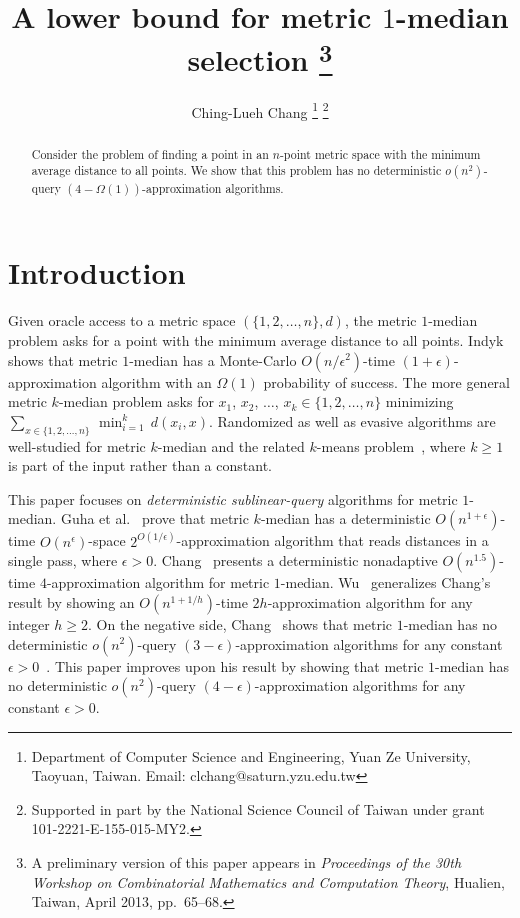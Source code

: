 \documentclass[letterpaper,12pt]{article}
\begin{document}
\title{A lower bound for metric $1$-median selection \footnote{A
preliminary version of this paper appears in {\em Proceedings of the 30th
Workshop on Combinatorial Mathematics and Computation Theory}, Hualien,
Taiwan, April 2013, pp.~65--68.}}

\author{
Ching-Lueh Chang \footnote{Department of Computer Science and
Engineering, Yuan Ze University, Taoyuan, Taiwan. Email:
clchang@saturn.yzu.edu.tw}
\footnote{Supported in part by the National Science Council
of Taiwan under
grant
101-2221-E-155-015-MY2.}
}


\maketitle

\begin{abstract}
Consider the problem of finding
a point in
an $n$-point
metric space
with the minimum average distance to
all
points.
We show
that
this problem
has no deterministic
$o(n^2)$-query $(4-\Omega(1))$-approximation algorithms.
\end{abstract}

\section{Introduction}

Given oracle access to
a
metric
space $(\{1,2,\ldots,n\},d)$,
the {\sc metric $1$-median}
problem asks for a point with the minimum average distance to all points.
Indyk~\cite{Ind99, Ind00} shows that {\sc metric $1$-median} has a
Monte-Carlo $O(n/\epsilon^2)$-time $(1+\epsilon)$-approximation algorithm
with an $\Omega(1)$ probability of success.
The more general {\sc metric $k$-median} problem asks for
$x_1$,
$x_2$, $\ldots$, $x_k\in\{1,2,\ldots,n\}$ minimizing
$\sum_{x\in\{1,2,\ldots,n\}}\,\min_{i=1}^k\,d(x_i,x)$.
Randomized
as well as
evasive
algorithms are well-studied for
{\sc metric $k$-median} and the related $k$-means problem~\cite{GMMMO03,
MP04, AGKMMP04, Che09, KSS10, JKS12},
where $k\ge 1$ is part of the input rather than a constant.


This paper focuses on {\em deterministic sublinear-query} algorithms for
{\sc metric $1$-median}.
Guha et al.~\cite[Sec.~3.1--3.2]{GMMMO03} prove
that {\sc metric $k$-median} has
a deterministic
$O(n^{1+\epsilon})$-time
$O(n^\epsilon)$-space
$2^{O(1/\epsilon)}$-approximation algorithm
that reads distances in a single pass, where $\epsilon>0$.
Chang~\cite{Cha13} presents a deterministic
nonadaptive
$O(n^{1.5})$-time $4$-approximation algorithm for {\sc metric $1$-median}.
Wu~\cite{Wu14} generalizes Chang's result by showing an
$O(n^{1+1/h})$-time
$2h$-approximation
algorithm for
any integer $h\ge 2$.
On the negative side,
Chang~\cite{Cha12}
shows that {\sc metric $1$-median}
has no
deterministic
$o(n^2)$-query
$(3-\epsilon)$-approximation algorithms for any constant
$\epsilon>0$~\cite{Cha12}.
This
paper
improves upon his result by showing
that {\sc metric $1$-median} has no deterministic
$o(n^2)$-query $(4-\epsilon)$-approximation algorithms for any
constant $\epsilon>0$.
\end{document}
